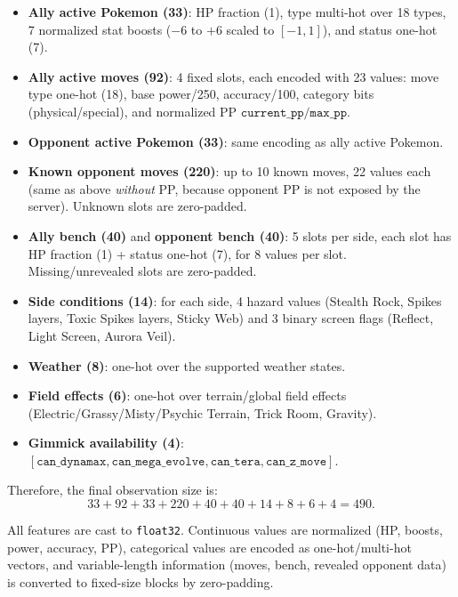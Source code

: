 \begin{itemize}
	\item \textbf{Ally active Pokemon (33)}: HP fraction (1), type multi-hot over 18 types,
	7 normalized stat boosts (\(-6\) to \(+6\) scaled to \([-1,1]\)), and status one-hot (7).

	\item \textbf{Ally active moves (92)}: 4 fixed slots, each encoded with 23 values:
	move type one-hot (18), base power/250, accuracy/100, category bits (physical/special),
	and normalized PP \(\texttt{current\_pp}/\texttt{max\_pp}\).

	\item \textbf{Opponent active Pokemon (33)}: same encoding as ally active Pokemon.

	\item \textbf{Known opponent moves (220)}: up to 10 known moves, 22 values each
	(same as above \emph{without} PP, because opponent PP is not exposed by the server).
	Unknown slots are zero-padded.

	\item \textbf{Ally bench (40)} and \textbf{opponent bench (40)}:
	5 slots per side, each slot has HP fraction (1) + status one-hot (7), for 8 values per slot.
	Missing/unrevealed slots are zero-padded.

	\item \textbf{Side conditions (14)}:
	for each side, 4 hazard values (Stealth Rock, Spikes layers, Toxic Spikes layers, Sticky Web)
	and 3 binary screen flags (Reflect, Light Screen, Aurora Veil).

	\item \textbf{Weather (8)}: one-hot over the supported weather states.

	\item \textbf{Field effects (6)}: one-hot over terrain/global field effects
	(Electric/Grassy/Misty/Psychic Terrain, Trick Room, Gravity).

	\item \textbf{Gimmick availability (4)}:
	\([\texttt{can\_dynamax},\texttt{can\_mega\_evolve},\texttt{can\_tera},\texttt{can\_z\_move}]\).
\end{itemize}

Therefore, the final observation size is:
\[
33 + 92 + 33 + 220 + 40 + 40 + 14 + 8 + 6 + 4 = 490.
\]

All features are cast to \texttt{float32}. Continuous values are normalized (HP, boosts,
power, accuracy, PP), categorical values are encoded as one-hot/multi-hot vectors, and variable-length
information (moves, bench, revealed opponent data) is converted to fixed-size blocks by zero-padding.

